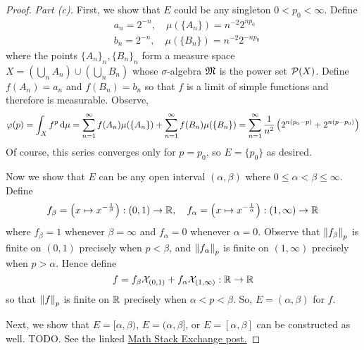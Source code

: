 \begin{proof}
    \emph{Part (c).} First, we show that \(E\) could be any singleton \(0 < p_0 < \infty\). Define 
    \begin{align*}
        & a_n = 2^{-n}, \quad \mu(\{A_n\}) = n^{-2} 2^{np_0}  \\
        & b_n = 2^{-n}, \quad \mu(\{B_n\}) = n^{-2} 2^{-np_0}
    \end{align*}
    where the points \(\{A_n\}_n, \{B_n\}_n\) form a measure space \(X = \left(\bigcup_n A_n\right) \cup \left(\bigcup_n B_n\right)\) whose \(\sigma\)-algebra \(\mathfrak{M}\) is the power set \(\mathcal{P}(X)\). Define \(f(A_n) = a_n\) and \(f(B_n) = b_n\) so that \(f\) is a limit of simple functions and therefore is measurable. Observe, 
    \[
        \varphi(p) = \int_X f^p \, \mathrm{d}\mu = \sum_{n=1}^\infty f(A_n) \mu(\{A_n\}) + \sum_{n=1}^\infty f(B_n) \mu(\{B_n\})
        = \sum_{n=1}^\infty \frac{1}{n^2} \left( 2^{n(p_0 - p)} + 2^{n(p - p_0)} \right)
    \]
    Of course, this series converges only for \(p = p_0\), so \(E = \{p_0\}\) as desired. 
    \stdvspace

    Now we show that \(E\) can be any open interval \((\alpha, \beta)\) where \(0 \leq \alpha < \beta \leq \infty\). Define
    \[
        f_\beta = \left(x \mapsto x^{-\frac{1}{\beta}}\right) : (0,1) \to \mathbb{R}, 
        \quad 
        f_\alpha = \left(x \mapsto x^{-\frac{1}{\alpha}}\right) : (1,\infty) \to \mathbb{R}
    \]
    where \(f_\beta = 1\) whenever \(\beta = \infty\) and \(f_\alpha = 0\) whenever \(\alpha = 0\). Observe that \(\norm{f_\beta}_p\) is finite on \((0,1)\) precisely when \(p < \beta\), and \(\norm{f_\alpha}_p\) is finite on \((1, \infty)\) precisely when \(p > \alpha\). Hence define 
   \[
        f = f_\beta \mathcal{X}_{(0,1)} + f_\alpha \mathcal{X}_{(1, \infty)} : \mathbb{R} \to \mathbb{R}
    \]
    so that \(\norm{f}_p\) is finite on \(\mathbb{R}\) precisely when \(\alpha < p < \beta\). So, \(E = (\alpha, \beta)\) for \(f\). 
    \stdvspace

    Next, we show that \(E = [\alpha, \beta)\), \(E = (\alpha, \beta]\), or \(E = [\alpha, \beta]\) can be constructed as well. TODO. See the linked \href{https://math.stackexchange.com/questions/3186292/rudins-real-and-complex-analysis-exercise-3-4-c}{Math Stack Exchange post.} 
\end{proof}

